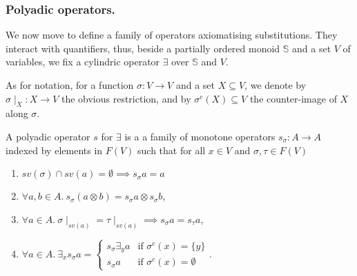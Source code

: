 \documentclass{llncs}
\def\monid{{\mathbf 0}}
\def\monop{\otimes}
\def\monid{\mathbf{1}}
\begin{document}
%
%
%
%


\subsubsection{Polyadic operators.}
We now move to define a family of operators axiomatising substitutions.  
They interact with quantifiers, thus, beside a partially ordered monoid $\mathbb{S}$
and a set $V$ of variables, we fix a cylindric operator $\exists$ over ${\mathbb S}$ and $V$.

As for notation, for a function $\sigma: V \rightarrow V$ and a set $X \subseteq V$, we denote by 
$\sigma \mid_{X}: X \rightarrow V$ the obvious restriction, and
by $\sigma^{c}(X) \subseteq V$ the counter-image of $X$ along $\sigma$.


\begin{definition}[polyadification]
	\label{def:poly}
	A polyadic operator $s$ for $\exists$ is a a family of monotone operators $s_\sigma: A \rightarrow A$
	indexed by elements in $F(V)$ such that for all $x \in V$ and $\sigma, \tau\in F(V)$
	\begin{enumerate}
		\item $sv(\sigma) \cap sv(a) = \emptyset \implies s_\sigma a = a$
		\item $\forall a, b \in A.\ s_\sigma(a \monop b) = s_\sigma a \monop s_\sigma b$,
        \item $\forall a \in A.\ \sigma \mid_{sv(a)} = \tau \mid_{sv(a)} \implies s_\sigma a 
        = s_\tau a$,
        \item $\forall a \in A.\ \exists_x s_\sigma a = \begin{cases}
			s_\sigma \exists_y a &\text{if $\sigma^c(x) = \{y\}$}\\
			s_\sigma a &\text{if $\sigma^c(x) = \emptyset$}
			\end{cases}$.				
    \end{enumerate}
\end{definition}
\end{document}
